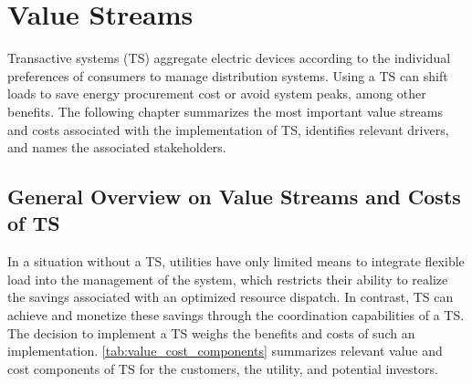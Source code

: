 \chapter{Value Streams}


Transactive systems (TS) aggregate electric devices according to the individual preferences of consumers to manage distribution systems. Using a TS can shift loads to save energy procurement cost or avoid system peaks, among other benefits. The following chapter summarizes the most important value streams and costs associated with the implementation of TS, identifies relevant drivers, and names the associated stakeholders.

\section{General Overview on Value Streams and Costs of TS}

In a situation without a TS, utilities have only limited means to integrate flexible load into the management of the system, which restricts their ability to realize the savings associated with an optimized resource dispatch. In contrast, TS can achieve and monetize these savings through the coordination capabilities of a TS. The decision to implement a TS weighs the benefits and costs of such an implementation. \cref{tab:value_cost_components} summarizes relevant value and cost components of TS for the customers, the utility, and potential investors. 

